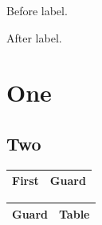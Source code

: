\documentclass{book}
\begin{document}
\begin{titlepage}
Before label.
\def\svgwidth{100pt}

After label.
\end{titlepage}
\part{One}
\chapter{Two}
\begin{tabular}{|l|l|}
\hline
First & Guard\\
\hline
\end{tabular}

\begin{tabular}{|l|l|}
\hline
Guard & Table\\
\hline
\end{tabular}
\end{document}
